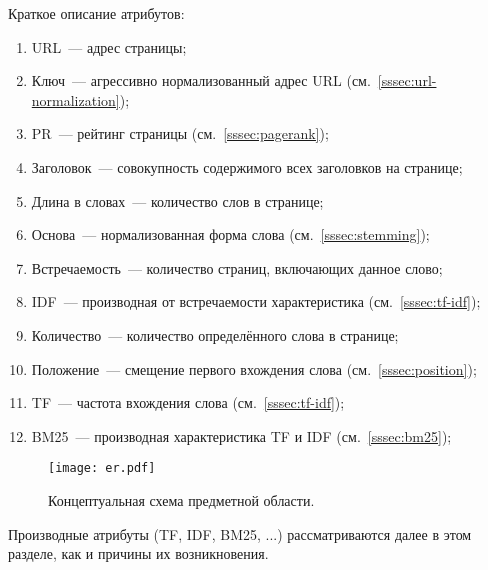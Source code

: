 Краткое описание атрибутов:
\begin{enumerate}
  \item URL~--- адрес страницы;
  \item Ключ~--- агрессивно нормализованный адрес URL (см.~\ref{sssec:url-normalization});
  \item PR~--- рейтинг страницы (см.~\ref{sssec:pagerank});
  \item Заголовок~--- совокупность содержимого всех заголовков на странице;
  \item Длина в словах~--- количество слов в странице;
  \item Основа~--- нормализованная форма слова (см.~\ref{sssec:stemming});
  \item Встречаемость~--- количество страниц, включающих данное слово;
  \item IDF~--- производная от встречаемости характеристика (см.~\ref{sssec:tf-idf});
  \item Количество~--- количество определённого слова в странице;
  \item Положение~--- смещение первого вхождения слова (см.~\ref{sssec:position});
  \item TF~--- частота вхождения слова (см.~\ref{sssec:tf-idf});
  \item BM25~--- производная характеристика TF и IDF (см.~\ref{sssec:bm25});
\end{enumerate}

\begin{figure}[h]
  \centering
  \texttt{[image: er.pdf]}
  \caption{Концептуальная схема предметной области.}
  \label{fig:er}
\end{figure}

Производные атрибуты (TF, IDF, BM25, ...) рассматриваются далее в этом разделе, как и причины их возникновения.




